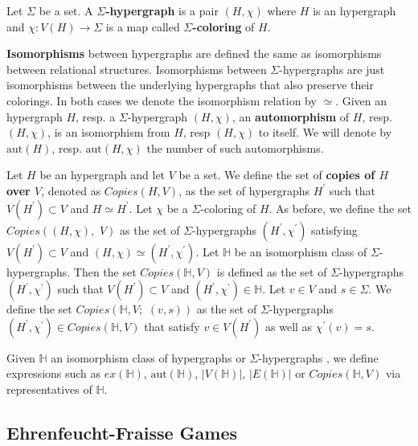 \documentclass[12pt,notitlepage,a4paper]{article}
\theoremstyle{definition}
\newcommand{\aut}{\mathrm{aut}}
\begin{document}
Let $\Sigma$ be a set. A \textbf{$\Sigma$-hypergraph}
is a pair $(H, \chi)$ where $H$ is an hypergraph
and $\chi: V(H)\rightarrow \Sigma$ is a map 
called \textbf{$\Sigma$-coloring} of $H$. \par


\textbf{Isomorphisms} between hypergraphs are defined the same as 
isomorphisms between relational structures. Isomorphisms between $\Sigma$-hypergraphs are just
isomorphisms between the underlying hypergraphs that also preserve their colorings. 
In both cases we denote the isomorphism relation by $\simeq$. 
Given an hypergraph $H$, resp. a $\Sigma$-hypergraph $(H, \chi)$,
an \textbf{automorphism} of $H$, resp. $(H,\chi)$,
is an isomorphism from $H$, resp $(H,\chi)$ to itself.
We will denote by $\aut(H)$, resp. $\aut(H,\chi)$
 the number of such automorphisms. \par

Let $H$ be an hypergraph and let $V$ be a set. We define the
set of \textbf{copies of $H$ over $V$}, denoted as $Copies(H,V)$, 
as the set of hypergraphs 
$H^\prime$ such that
$V(H^\prime)\subset V$ and $H\simeq H^\prime$. Let 
$\chi$ be a $\Sigma$-coloring of $H$. 
As before, we define the set $Copies\left(
(H,\chi),\, \, V\right)$ as the set of $\Sigma$-hypergraphs
$(H^\prime,\chi^\prime)$ satisfying $V(H^\prime)\subset V$ and
$(H,\chi)\simeq (H^\prime,\chi^\prime)$. Let $\mathbb{H}$ be 
an isomorphism class of $\Sigma$-hypergraphs. Then the set
$Copies(\mathbb{H}, V)$ is defined as the set of $\Sigma$-hypergraphs
$(H^\prime,\chi^\prime)$ such that 
$V(H^\prime)\subset V$ and
$(H^\prime,\chi^\prime)\in \mathbb{H}$. 
Let $v\in V$ and $s\in \Sigma$. We define the
set $Copies\left(\mathbb{H}, V;\,\, (v,s)\right)$ 
as the set of $\Sigma$-hypergraphs
$(H^\prime,\chi^\prime)\in Copies(\mathbb{H}, V)$
that satisfy $v\in V(H^\prime)$ as well as
$\chi^\prime(v)=s$. \par

Given $\mathbb{H}$ an isomorphism class of hypergraphs or $\Sigma$-hypergraphs
, we define expressions
such as $ex(\mathbb{H})$, $\aut(\mathbb{H})$,
$|V(\mathbb{H})|$, $|E(\mathbb{H})|$ or
$Copies(\mathbb{H},V)$ via representatives of $\mathbb{H}$.\par 




\subsection{Ehrenfeucht-Fraisse Games}
\end{document}
